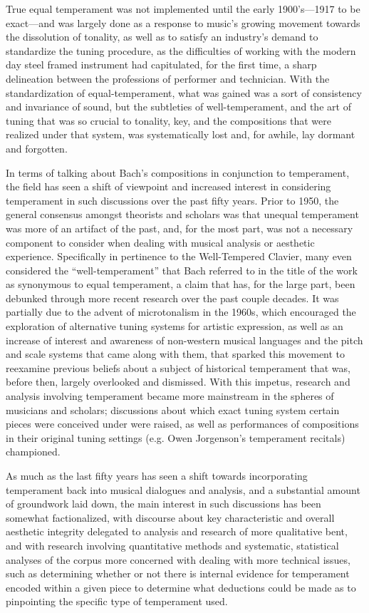 True equal temperament was not implemented until the early 1900's---1917
to be exact---and was largely done as a response to music's growing
movement towards the dissolution of tonality, as well as to satisfy an
industry's demand to standardize the tuning procedure, as the
difficulties of working with the modern day steel framed instrument had
capitulated, for the first time, a sharp delineation between the
professions of performer and technician. With the standardization of
equal-temperament, what was gained was a sort of consistency and
invariance of sound, but the subtleties of well-temperament, and the art
of tuning that was so crucial to tonality, key, and the compositions
that were realized under that system, was systematically lost and, for
awhile, lay dormant and forgotten.

In terms of talking about Bach's compositions in conjunction to
temperament, the field has seen a shift of viewpoint and increased
interest in considering temperament in such discussions over the past
fifty years. Prior to 1950, the general consensus amongst theorists and
scholars was that unequal temperament was more of an artifact of the
past, and, for the most part, was not a necessary component to consider
when dealing with musical analysis or aesthetic experience. Specifically
in pertinence to the Well-Tempered Clavier, many even considered the
``well-temperament'' that Bach referred to in the title of the work as
synonymous to equal temperament, a claim that has, for the large part,
been debunked through more recent research over the past couple decades.
It was partially due to the advent of microtonalism in the 1960s, which
encouraged the exploration of alternative tuning systems for artistic
expression, as well as an increase of interest and awareness of
non-western musical languages and the pitch and scale systems that came
along with them, that sparked this movement to reexamine previous
beliefs about a subject of historical temperament that was, before then,
largely overlooked and dismissed. With this impetus, research and
analysis involving temperament became more mainstream in the spheres of
musicians and scholars; discussions about which exact tuning system
certain pieces were conceived under were raised, as well as performances
of compositions in their original tuning settings (e.g. Owen Jorgenson's
temperament recitals) championed.

As much as the last fifty years has seen a shift towards incorporating
temperament back into musical dialogues and analysis, and a substantial
amount of groundwork laid down, the main interest in such discussions
has been somewhat factionalized, with discourse about key characteristic
and overall aesthetic integrity delegated to analysis and research of
more qualitative bent, and with research involving quantitative methods
and systematic, statistical analyses of the corpus more concerned with
dealing with more technical issues, such as determining whether or not
there is internal evidence for temperament encoded within a given piece
to determine what deductions could be made as to pinpointing the
specific type of temperament used.

